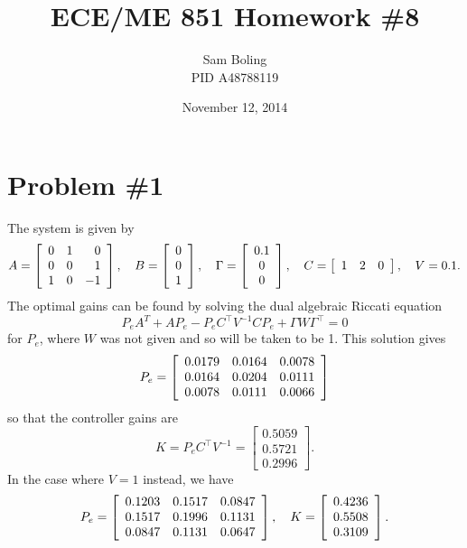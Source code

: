 \documentclass{article}
\title{ECE/ME 851 Homework \#8}
\date{November 12, 2014}
\author{Sam Boling \\ PID A48788119}
\begin{document}
\maketitle

\section*{Problem \#1}
The system is given by
$$
A =
\left[\begin{array}{r r r}
  0 & 1 &  0 \\
  0 & 0 &  1 \\
  1 & 0 & -1
\end{array}\right], \quad
B =
\left[\begin{array}{c}
  0  \\
  0  \\
  1
\end{array}\right], \quad
\Gamma =
\left[\begin{array}{c}
  0.1 \\
    0 \\
    0
\end{array}\right], \quad
C =
\left[\begin{array}{c c c}
  1 & 2 &  0
\end{array}\right], \quad
V = 0.1.
$$
The optimal gains can be found by solving the dual algebraic Riccati
equation
$$
P_e A^T + A P_e - P_e C^\top V^{-1} C P_e + \Gamma W \Gamma^\top = 0
$$
for $P_e$, where $W$ was not given and so will be taken to be 1. This
solution gives
$$
P_e =
\left[\begin{array}{c c c}
  0.0179 & 0.0164 & 0.0078 \\
  0.0164 & 0.0204 & 0.0111 \\
  0.0078 & 0.0111 & 0.0066
\end{array}\right]
$$
so that the controller gains are
$$
  K
= P_e C^\top V^{-1}
=
\left[\begin{array}{c}
  0.5059 \\
  0.5721 \\
  0.2996
\end{array}\right].
$$
In the case where $V = 1$ instead, we have
$$
P_e =
\left[\begin{array}{c c c}
  0.1203 & 0.1517 & 0.0847 \\
  0.1517 & 0.1996 & 0.1131 \\
  0.0847 & 0.1131 & 0.0647
\end{array}\right], \quad
K =
\left[\begin{array}{c}
  0.4236 \\
  0.5508 \\
  0.3109
\end{array}\right].
$$
\end{document}
